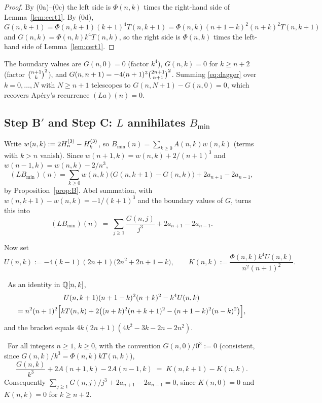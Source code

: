 \begin{proof}
By (0a)--(0c) the left side is $\Phi(n,k)$ times the right-hand side of
Lemma~\ref{lem:cert1}. By (0d),
$G(n,k+1)=\Phi(n,k+1)(k+1)^4T(n,k+1)=\Phi(n,k)(n+1-k)^2(n+k)^2T(n,k+1)$ and
$G(n,k)=\Phi(n,k)k^4T(n,k)$, so the right side is $\Phi(n,k)$ times the left-hand side of
Lemma~\ref{lem:cert1}.
\end{proof}

The boundary values are $G(n,0)=0$ (factor $k^4$), $G(n,k)=0$ for $k\ge n+2$ (factor
$\binom{n+1}{k}^2$), and $G(n,n+1)=-4(n+1)^3\binom{2n+1}{n+1}^2$. Summing \eqref{eq:dagger} over
$k=0,\dots,N$ with $N\ge n+1$ telescopes to $G(n,N+1)-G(n,0)=0$, which recovers Ap\'ery's
recurrence $(La)(n)=0$.

\subsection{Step B\texorpdfstring{$'$}{'} and Step C: \texorpdfstring{$L$ annihilates $B_{\min}$}{L annihilates B\_min}}

Write $w(n,k):=2H^{(3)}_{n}-H^{(3)}_{k}$, so $B_{\min}(n)=\sum_{k\ge0}A(n,k)w(n,k)$ (terms with $k>n$
vanish). Since $w(n+1,k)=w(n,k)+2/(n+1)^3$ and $w(n-1,k)=w(n,k)-2/n^3$,
\[
   (LB_{\min})(n)=\sum_{k\ge0}w(n,k)\bigl(G(n,k+1)-G(n,k)\bigr)+2a_{n+1}-2a_{n-1},
\]
by Proposition~\ref{prop:B}. Abel summation, with $w(n,k+1)-w(n,k)=-1/(k+1)^3$ and the
boundary values of $G$, turns this into
\begin{equation}\label{eq:Bprime}
   (LB_{\min})(n)\;=\;\sum_{j\ge1}\frac{G(n,j)}{j^3}+2a_{n+1}-2a_{n-1}.
\end{equation}

Now set
\begin{equation}\label{eq:UK}
   U(n,k):=-4(k-1)(2n+1)\bigl(2n^2+2n+1-k\bigr),
   \qquad
   K(n,k):=\frac{\Phi(n,k)k^4U(n,k)}{n^2(n+1)^2}.
\end{equation}

\begin{lemma}[CERT-2]\label{lem:cert2}
\Proved\ As an identity in $\mathbb{Q}[n,k]$,
\begin{multline*}
   U(n,k+1)(n+1-k)^2(n+k)^2-k^4U(n,k)\\
   =n^2(n+1)^2\Bigl[kT(n,k)+2\bigl((n+k)^2(n+k+1)^2-(n+1-k)^2(n-k)^2\bigr)\Bigr],
\end{multline*}
and the bracket equals $4k(2n+1)(4k^2-3k-2n-2n^2)$.
\end{lemma}

\begin{proposition}\label{prop:C}
\Proved\ For all integers $n\ge1$, $k\ge0$, with the convention $G(n,0)/0^3:=0$
(consistent, since $G(n,k)/k^3=\Phi(n,k)kT(n,k)$),
\begin{equation}\label{eq:ddagger}
   \frac{G(n,k)}{k^3}+2A(n+1,k)-2A(n-1,k)\;=\;K(n,k+1)-K(n,k).
\end{equation}
Consequently $\sum_{j\ge1}G(n,j)/j^3+2a_{n+1}-2a_{n-1}=0$, since $K(n,0)=0$ and
$K(n,k)=0$ for $k\ge n+2$.
\end{proposition}

